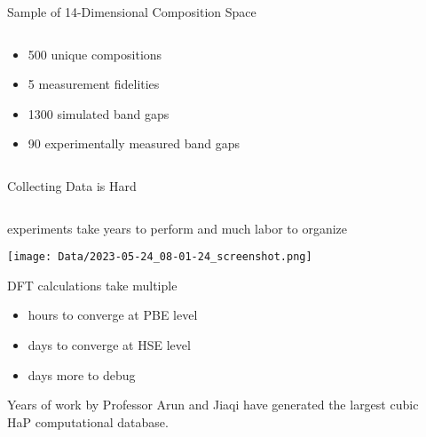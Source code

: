 \documentclass[10pt, aspectratio=169, presentation]{beamer}
\begin{document}
\begin{frame}[label={sec:org2a430f1}]{Sample of 14-Dimensional Composition Space}
\begin{columns}
\begin{column}{0.5\columnwidth}
\begin{itemize}
\item 500 unique compositions
\item 5 measurement fidelities
\item 1300 simulated band gaps
\item 90 experimentally measured band gaps
\end{itemize}

 
\begin{center}

\end{center}
\end{column}

\begin{column}{0.5\columnwidth}
 
\begin{center}

\end{center}
\end{column}
\end{columns}
\end{frame}

\begin{frame}[label={sec:orgc68b8e9}]{Collecting Data is Hard}
\begin{columns}
\begin{column}{0.7\columnwidth}
experiments take years to perform and much labor to organize
\autocite{almora-2020-devic-perfor}

\begin{center}
\texttt{[image: Data/2023-05-24\_08-01-24\_screenshot.png]}
\end{center}

\vspace{-0.5cm}DFT calculations take multiple
\begin{itemize}
\item hours to converge at PBE level
\item days to converge at HSE level
\item days more to debug
\end{itemize}
Years of work by Professor Arun and Jiaqi have generated
the largest cubic HaP computational database.\autocite{yang-2023-high-throug}
\end{column}

\begin{column}{0.3\columnwidth}
 
\begin{center}

\end{center}
\end{column}
\end{columns}
\end{frame}
\end{document}
